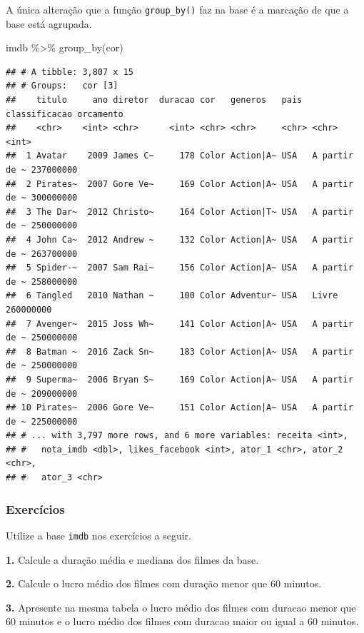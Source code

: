 \documentclass[
]{book}
\newenvironment{Shaded}{\begin{snugshade}}{\end{snugshade}}
\newcommand{\FunctionTok}[1]{\textcolor[rgb]{0.00,0.00,0.00}{#1}}
\newcommand{\NormalTok}[1]{#1}
\newcommand{\SpecialCharTok}[1]{\textcolor[rgb]{0.00,0.00,0.00}{#1}}
\begin{document}
A única alteração que a função \texttt{group\_by()} faz na base é a marcação de que a base está agrupada.

\begin{Shaded}
\begin{Highlighting}[]
\NormalTok{imdb }\SpecialCharTok{\%\textgreater{}\%} \FunctionTok{group\_by}\NormalTok{(cor)}
\end{Highlighting}
\end{Shaded}

\begin{verbatim}
## # A tibble: 3,807 x 15
## # Groups:   cor [3]
##    titulo     ano diretor  duracao cor   generos   pais  classificacao orcamento
##    <chr>    <int> <chr>      <int> <chr> <chr>     <chr> <chr>             <int>
##  1 Avatar    2009 James C~     178 Color Action|A~ USA   A partir de ~ 237000000
##  2 Pirates~  2007 Gore Ve~     169 Color Action|A~ USA   A partir de ~ 300000000
##  3 The Dar~  2012 Christo~     164 Color Action|T~ USA   A partir de ~ 250000000
##  4 John Ca~  2012 Andrew ~     132 Color Action|A~ USA   A partir de ~ 263700000
##  5 Spider-~  2007 Sam Rai~     156 Color Action|A~ USA   A partir de ~ 258000000
##  6 Tangled   2010 Nathan ~     100 Color Adventur~ USA   Livre         260000000
##  7 Avenger~  2015 Joss Wh~     141 Color Action|A~ USA   A partir de ~ 250000000
##  8 Batman ~  2016 Zack Sn~     183 Color Action|A~ USA   A partir de ~ 250000000
##  9 Superma~  2006 Bryan S~     169 Color Action|A~ USA   A partir de ~ 209000000
## 10 Pirates~  2006 Gore Ve~     151 Color Action|A~ USA   A partir de ~ 225000000
## # ... with 3,797 more rows, and 6 more variables: receita <int>,
## #   nota_imdb <dbl>, likes_facebook <int>, ator_1 <chr>, ator_2 <chr>,
## #   ator_3 <chr>
\end{verbatim}

\hypertarget{exercuxedcios-15}{%
\subsubsection*{Exercícios}\label{exercuxedcios-15}}

Utilize a base \texttt{imdb} nos exercícios a seguir.

\textbf{1.} Calcule a duração média e mediana dos filmes da base.

\textbf{2.} Calcule o lucro médio dos filmes com duração menor que 60 minutos.

\textbf{3.} Apresente na mesma tabela o lucro médio dos filmes com duracao menor que 60 minutos e o lucro médio dos filmes com duracao maior ou igual a 60 minutos.
\end{document}
